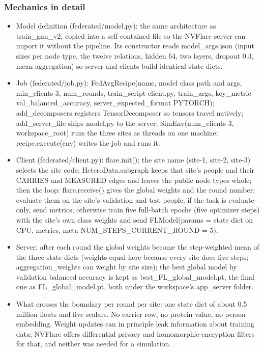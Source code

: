 \documentclass[11pt,a4paper]{article}
\begin{document}
\subsubsection{Mechanics in detail}

\begin{itemize}[leftmargin=1.4em]
  \item Model definition (federated/model.py): the same architecture as train\_gnn\_v2, copied into a self-contained file so the NVFlare server can import it without the pipeline. Its constructor reads model\_args.json (input sizes per node type, the twelve relations, hidden 64, two layers, dropout 0.3, mean aggregation) so server and clients build identical state dicts.
  \item Job (federated/job.py): FedAvgRecipe(name, model class path and args, min\_clients 3, num\_rounds, train\_script client.py, train\_args, key\_metric val\_balanced\_accuracy, server\_expected\_format PYTORCH); add\_decomposers registers TensorDecomposer so tensors travel natively; add\_server\_file ships model.py to the server; SimEnv(num\_clients 3, workspace\_root) runs the three sites as threads on one machine; recipe.execute(env) writes the job and runs it.
  \item Client (federated/client.py): flare.init(); the site name (site-1, site-2, site-3) selects the site code; HeteroData.subgraph keeps that site's people and their CARRIES and MEASURED edges and leaves the public node types whole; then the loop: flare.receive() gives the global weights and the round number; evaluate them on the site's validation and test people; if the task is evaluate-only, send metrics; otherwise train five full-batch epochs (five optimizer steps) with the site's own class weights and send FLModel(params = state dict on CPU, metrics, meta NUM\_STEPS\_CURRENT\_ROUND = 5).
  \item Server: after each round the global weights become the step-weighted mean of the three state dicts (weights equal here because every site does five steps; aggregation\_weights can weight by site size); the best global model by validation balanced accuracy is kept as best\_FL\_global\_model.pt, the final one as FL\_global\_model.pt, both under the workspace's app\_server folder.
  \item What crosses the boundary per round per site: one state dict of about 0.5 million floats and five scalars. No carrier row, no protein value, no person embedding. Weight updates can in principle leak information about training data; NVFlare offers differential privacy and homomorphic-encryption filters for that, and neither was needed for a simulation.

\end{itemize}
\end{document}
